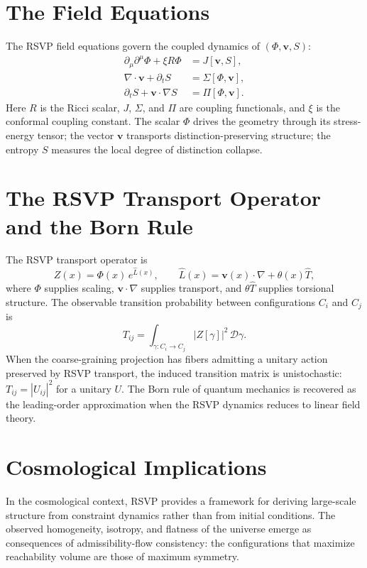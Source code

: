 \documentclass[12pt,a4paper]{book}
\theoremstyle{remark}
\theoremstyle{definition}
\begin{document}
\section{The Field Equations}

The RSVP field equations govern the coupled dynamics of $(\Phi, \mathbf{v}, S)$:
\begin{align}
  \partial_\mu\partial^\mu\Phi + \xi R\Phi &= J[\mathbf{v}, S], \\
  \nabla \cdot \mathbf{v} + \partial_t S &= \Sigma[\Phi, \mathbf{v}], \\
  \partial_t S + \mathbf{v}\cdot\nabla S &= \Pi[\Phi, \mathbf{v}].
\end{align}
Here $R$ is the Ricci scalar, $J$, $\Sigma$, and $\Pi$ are coupling
functionals, and $\xi$ is the conformal coupling constant. The scalar
$\Phi$ drives the geometry through its stress-energy tensor; the vector
$\mathbf{v}$ transports distinction-preserving structure; the entropy
$S$ measures the local degree of distinction collapse.

\section{The RSVP Transport Operator and the Born Rule}

The RSVP transport operator is
\begin{equation}
  Z(x) = \Phi(x)\, e^{\widehat{L}(x)},
  \qquad
  \widehat{L}(x) = \mathbf{v}(x)\cdot\nabla + \theta(x)\widehat{T},
\end{equation}
where $\Phi$ supplies scaling, $\mathbf{v}\cdot\nabla$ supplies transport,
and $\theta\widehat{T}$ supplies torsional structure. The observable
transition probability between configurations $C_i$ and $C_j$ is
\begin{equation}
  T_{ij} = \int_{\gamma : C_i \to C_j} |Z[\gamma]|^2\,\mathcal{D}\gamma.
\end{equation}
When the coarse-graining projection has fibers admitting a unitary action
preserved by RSVP transport, the induced transition matrix is unistochastic:
$T_{ij} = |U_{ij}|^2$ for a unitary $U$. The Born rule of quantum
mechanics is recovered as the leading-order approximation when the RSVP
dynamics reduces to linear field theory.

\section{Cosmological Implications}

In the cosmological context, RSVP provides a framework for deriving
large-scale structure from constraint dynamics rather than from initial
conditions. The observed homogeneity, isotropy, and flatness of the
universe emerge as consequences of admissibility-flow consistency: the
configurations that maximize reachability volume are those of maximum
symmetry.
\end{document}
